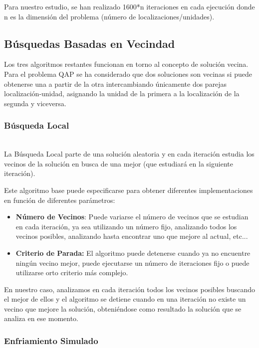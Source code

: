 \documentclass[runningheads,a4paper]{llncs}
\begin{document}
Para nuestro estudio, se han realizado 1600*n iteraciones en cada ejecución donde n es la dimensión del problema (número de localizaciones/unidades).

\subsection{Búsquedas Basadas en Vecindad}

Los tres algoritmos restantes funcionan en torno al concepto de solución vecina. Para el problema QAP se ha considerado que dos soluciones son vecinas si puede obtenerse una a partir de la otra intercambiando únicamente dos parejas localización-unidad, asignando la unidad de la primera a la localización de la segunda y viceversa.

\subsubsection{Búsqueda Local}
~\\

La Búsqueda Local parte de una solución aleatoria y en cada iteración estudia los vecinos de la solución en busca de una mejor (que estudiará en la siguiente iteración). 

Este algoritmo base puede especificarse para obtener diferentes implementaciones en función de diferentes parámetros:

\begin{itemize}
\item \textbf{Número de Vecinos}: Puede variarse el número de vecinos que se estudian en cada iteración, ya sea utilizando un número fijo, analizando todos los vecinos posibles, analizando hasta encontrar uno que mejore al actual, etc...
\item \textbf{Criterio de Parada:} El algoritmo puede detenerse cuando ya no encuentre ningún vecino mejor, puede ejecutarse un número de iteraciones fijo o puede utilizarse orto criterio más complejo.
\end{itemize} 

En nuestro caso, analizamos en cada iteración todos los vecinos posibles buscando el mejor de ellos y  el algoritmo se detiene cuando en una iteración no existe un vecino que mejore la solución, obteniéndose como resultado la solución que se analiza en ese momento.

\subsubsection{Enfriamiento Simulado}
~\\
\end{document}
